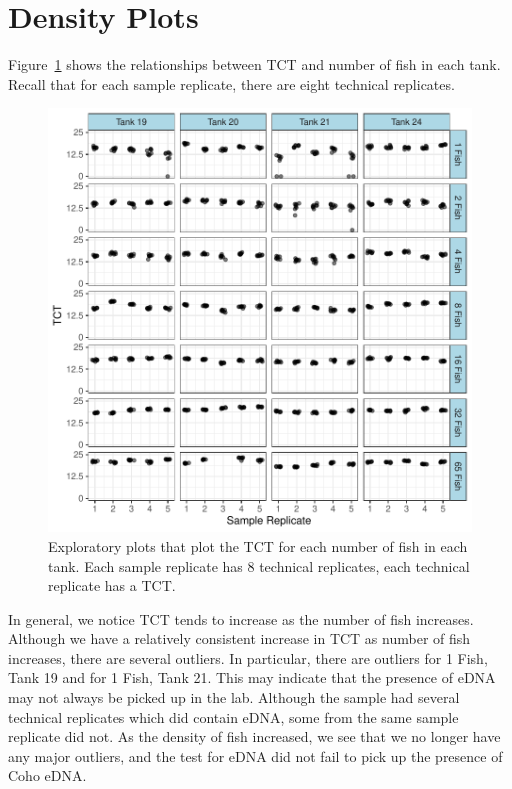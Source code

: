 \section{Density Plots}

 
Figure~\ref{lab:introplots122} shows the relationships between TCT and number of fish in each tank. Recall that for each sample replicate, there are eight technical replicates.


\begin{figure}[H]
\includegraphics{Chapter3Images/gt.pdf}
\begin{center}
\caption{\hspace{1mm} Exploratory plots that plot the TCT for each number of fish in each tank. Each sample replicate has 8 technical replicates, each technical replicate has a TCT. }
\label{lab:introplots122}
\end{center}
\end{figure}








 In general, we notice TCT tends to increase as the number of fish increases. Although we have a relatively consistent increase in TCT as number of fish increases, there are several outliers. In particular, there are outliers for 1 Fish, Tank 19 and for 1 Fish, Tank 21. This may indicate that the presence of eDNA may not always be picked up in the lab. Although the sample had several technical replicates which did contain eDNA, some from the same sample replicate did not. As the density of fish increased, we see that we no longer have any major outliers, and the test for eDNA did not fail to pick up the presence of Coho eDNA.
  

